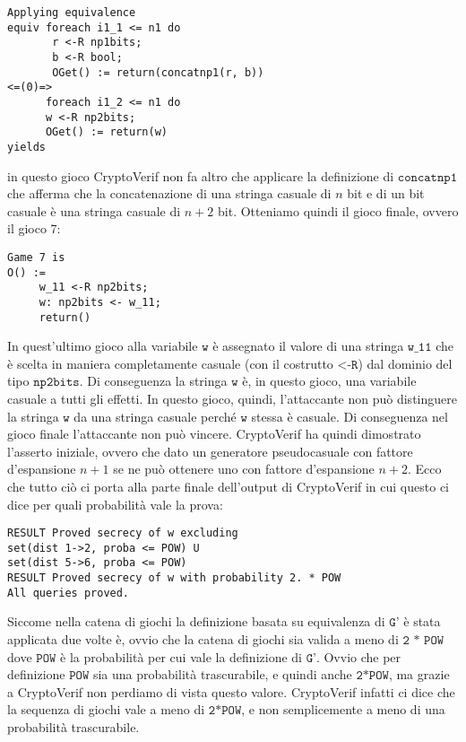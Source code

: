 \documentclass[a4paper,openright,twoside,12pt]{report}
\begin{document}
\begin{verbatim} 
Applying equivalence
equiv foreach i1_1 <= n1 do 
       r <-R np1bits; 
       b <-R bool; 
       OGet() := return(concatnp1(r, b))
<=(0)=>
      foreach i1_2 <= n1 do 
      w <-R np2bits; 
      OGet() := return(w)
yields
\end{verbatim}
in questo gioco CryptoVerif non fa altro che applicare la definizione di $\texttt{concatnp1}$ che afferma che 
la concatenazione di una stringa casuale di $n$ bit e di un bit casuale \`e una stringa casuale di $n+2$ bit.
Otteniamo quindi il gioco finale, ovvero il gioco 7:
\begin{verbatim}
Game 7 is
O() :=
     w_11 <-R np2bits;
     w: np2bits <- w_11;
     return()
\end{verbatim}
In quest'ultimo gioco alla variabile $\texttt{w}$ \`e assegnato il valore di una stringa $\texttt{w\_11}$ 
che \`e scelta in maniera completamente casuale (con il costrutto $\texttt{<-R}$) dal dominio del tipo $\texttt{np2bits}$.
Di conseguenza la stringa $\texttt{w}$ \`e, in questo gioco, una variabile casuale a tutti gli effetti.
In questo gioco, quindi, l'attaccante non pu\`o distinguere la stringa $\texttt{w}$ da una stringa casuale perch\'e $\texttt{w}$ stessa \`e casuale. 
Di conseguenza nel gioco finale l'attaccante non pu\`o vincere.
CryptoVerif ha quindi dimostrato l'asserto iniziale, ovvero che dato un generatore pseudocasuale con fattore d'espansione $n+1$ se ne pu\`o ottenere uno con fattore d'espansione $n+2$.
Ecco che tutto ci\`o ci porta alla parte finale dell'output di CryptoVerif in cui questo ci dice per quali probabilit\`a vale la prova:
\begin{verbatim} 
RESULT Proved secrecy of w excluding 
set(dist 1->2, proba <= POW) U 
set(dist 5->6, proba <= POW)
RESULT Proved secrecy of w with probability 2. * POW
All queries proved.
\end{verbatim}
Siccome nella catena di giochi la definizione basata su equivalenza di $\texttt{G'}$ \`e stata applicata due volte \`e,
ovvio che la catena di giochi sia valida a meno di $\texttt{2 * POW}$ dove $\texttt{POW}$ \`e la probabilit\`a
per cui vale la definizione di $\texttt{G'}$. Ovvio che per definizione $\texttt{POW}$ sia una probabilit\`a trascurabile, e quindi
anche $\texttt{2*POW}$, ma grazie a CryptoVerif non perdiamo di vista questo valore. CryptoVerif infatti ci dice
che la sequenza di giochi vale a meno di $\texttt{2*POW}$, e non semplicemente a meno di una probabilit\`a trascurabile.
\end{document}

